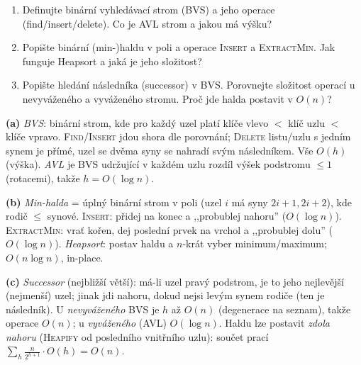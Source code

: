 \begin{zadani}
\begin{enumerate}[label=(\alph*)]
  \item {} Definujte binární vyhledávací strom (BVS) a jeho operace (find/insert/delete). Co je AVL strom a jakou má výšku?
  \item {} Popište binární (min-)haldu v poli a operace \textsc{Insert} a \textsc{ExtractMin}. Jak funguje Heapsort a jaká je jeho složitost?
  \item {} Popište hledání následníka (successor) v BVS. Porovnejte složitost operací u nevyváženého a vyváženého stromu. Proč jde halda postavit v $O(n)$?
\end{enumerate}
\end{zadani}

\begin{reseni}
\textbf{(a)} \emph{BVS}: binární strom, kde pro každý uzel platí klíče vlevo $<$ klíč uzlu $<$ klíče vpravo. \textsc{Find}/\textsc{Insert} jdou shora dle porovnání; \textsc{Delete} listu/uzlu s jedním synem je přímé, uzel se dvěma syny se nahradí svým následníkem. Vše $O(h)$ (výška). \emph{AVL} je BVS udržující v každém uzlu rozdíl výšek podstromu $\le1$ (rotacemi), takže $h=O(\log n)$.

\textbf{(b)} \emph{Min-halda} = úplný binární strom v poli (uzel $i$ má syny $2i{+}1,2i{+}2$), kde rodič $\le$ synové. \textsc{Insert}: přidej na konec a ,,probublej nahoru'' ($O(\log n)$). \textsc{ExtractMin}: vrať kořen, dej poslední prvek na vrchol a ,,probublej dolu'' ($O(\log n)$). \emph{Heapsort}: postav haldu a $n$-krát vyber minimum/maximum; $O(n\log n)$, in-place.

\textbf{(c)} \emph{Successor} (nejbližší větší): má-li uzel pravý podstrom, je to jeho nejlevější (nejmenší) uzel; jinak jdi nahoru, dokud nejsi levým synem rodiče (ten je následník). U \emph{nevyváženého} BVS je $h$ až $O(n)$ (degenerace na seznam), takže operace $O(n)$; u \emph{vyváženého} (AVL) $O(\log n)$. Haldu lze postavit \emph{zdola nahoru} (\textsc{Heapify} od posledního vnitřního uzlu): součet prací $\sum_h \tfrac{n}{2^{h+1}}\cdot O(h)=O(n)$.
\end{reseni}

